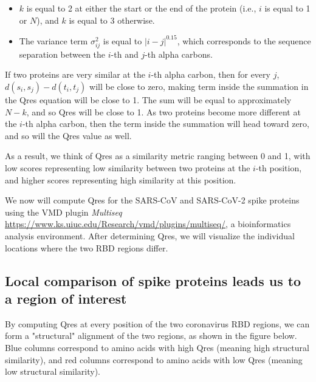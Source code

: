{{\begin{itemize}
	\item $k$ is equal to 2 at either the start or the end of the protein (i.e., $i$ is equal to 1 or $N$), and $k$ is equal to 3 otherwise.
	\item The variance term $\sigma_{ij}^2$ is equal to $\left\lvert{i-j}\right\rvert ^{0.15}$, which corresponds to the sequence separation between the $i$-th and $j$-th alpha carbons.
\end{itemize}

\begin{note}\end{note}

If two proteins are very similar at the $i$-th alpha carbon, then for every $j$, $d(s_{i}, s_{j}) - d(t_{i}, t_{j})$ will be close to zero, making term inside the summation in the Qres equation will be close to 1. The sum will be equal to approximately $N - k$, and so Qres will be close to 1. As two proteins become more different at the $i$-th alpha carbon, then the term inside the summation will head toward zero, and so will the Qres value as well.

As a result, we think of Qres as a similarity metric ranging between 0 and 1, with low scores representing low similarity between two proteins at the $i$-th position, and higher scores representing high similarity at this position.

We now will compute Qres for the SARS-CoV and SARS-CoV-2 spike proteins using the VMD plugin \textit{Multiseq} \url{https://www.ks.uiuc.edu/Research/vmd/plugins/multiseq/}, a bioinformatics analysis environment. After determining Qres, we will visualize the individual locations where the two RBD regions differ. 

\FloatBarrier
{}
\subsection{Local comparison of spike proteins leads us to a region of interest}

By computing Qres at every position of the two coronavirus RBD regions, we can form a "structural" alignment of the two regions, as shown in the figure below. Blue columns correspond to amino acids with high Qres (meaning high structural similarity), and red columns correspond to amino acids with low Qres (meaning low structural similarity).

}}
